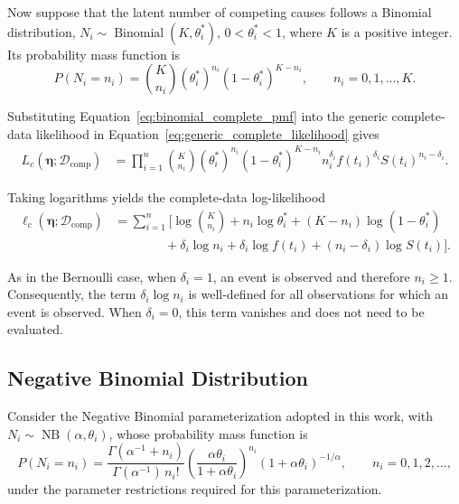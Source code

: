 Now suppose that the latent number of competing causes follows a
Binomial distribution, $N_i\sim\operatorname{Binomial}(K,\theta_i^*)\text{, } 0<\theta_i^*<1$,
where $K$ is a positive integer. Its probability mass function is
\begin{equation}
P(N_i=n_i)
=
{K\choose n_i}
(\theta_i^*)^{n_i}
(1-\theta_i^*)^{K-n_i},
\qquad
n_i=0,1,\ldots,K.
\label{eq:binomial_complete_pmf}
\end{equation}

Substituting Equation~\eqref{eq:binomial_complete_pmf} into the generic
complete-data likelihood in Equation~\eqref{eq:generic_complete_likelihood}
gives
\begin{align}
L_c
\left(
\boldsymbol{\eta};
\mathcal{D}_{\mathrm{comp}}
\right)
&=
\prod_{i=1}^n
{K\choose n_i}
(\theta_i^*)^{n_i}
(1-\theta_i^*)^{K-n_i}
n_i^{\delta_i}
f(t_i)^{\delta_i}
S(t_i)^{n_i-\delta_i}.
\label{eq:binomial_complete_likelihood}
\end{align}

Taking logarithms yields the complete-data log-likelihood
\begin{align}
\ell_c
\left(
\boldsymbol{\eta};
\mathcal{D}_{\mathrm{comp}}
\right)
&=
\sum_{i=1}^n
\Bigg[
\log {K\choose n_i}
+
n_i\log\theta_i^*
+
(K-n_i)\log(1-\theta_i^*)
\nonumber\\
&\qquad\qquad
+
\delta_i\log n_i
+
\delta_i\log f(t_i)
+
(n_i-\delta_i)\log S(t_i)
\Bigg].
\label{eq:binomial_complete_loglikelihood}
\end{align}

As in the Bernoulli case, when $\delta_i=1$, an event is observed and
therefore $n_i\geq1$. Consequently, the term $\delta_i\log n_i$ is
well-defined for all observations for which an event is observed. When
$\delta_i=0$, this term vanishes and does not need to be evaluated.

\subsection{Negative Binomial Distribution}

Consider the Negative Binomial parameterization adopted in this work,
with $N_i\sim\operatorname{NB}(\alpha,\theta_i)$,
whose probability mass function is
\begin{equation}
P(N_i=n_i)
=
\frac{
\Gamma(\alpha^{-1}+n_i)
}{
\Gamma(\alpha^{-1})\,n_i!
}
\left(
\frac{\alpha\theta_i}
{1+\alpha\theta_i}
\right)^{n_i}
(1+\alpha\theta_i)^{-1/\alpha},
\qquad
n_i=0,1,2,\ldots,
\label{eq:nb_complete_pmf}
\end{equation}
under the parameter restrictions required for this parameterization.

